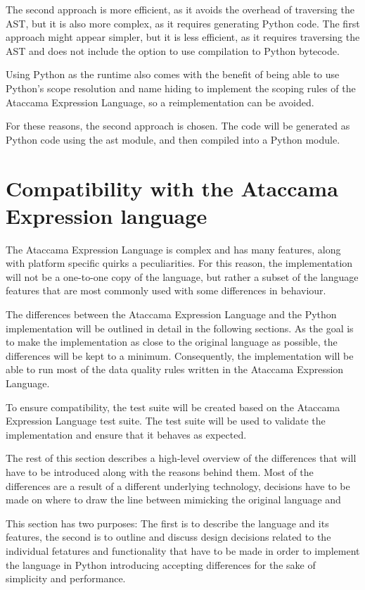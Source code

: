 The second approach is more efficient, as it avoids the overhead of traversing the AST, but it is also more complex, as it requires generating Python code. The first approach might appear simpler, but it is less efficient, as it requires traversing the AST and does not include the option to use compilation to Python bytecode.

Using Python as the runtime also comes with the benefit of being able to use Python's scope resolution and name hiding to implement the scoping rules of the Ataccama Expression Language, so a reimplementation can be avoided.

For these reasons, the second approach is chosen. The code will be generated as Python code using the ast module, and then compiled into a Python module.

\section{Compatibility with the Ataccama Expression language}

The Ataccama Expression Language is complex and has many features, along with
platform specific quirks a peculiarities. For this reason, the implementation will
not be a one-to-one copy of the language, but rather a subset of the language
features that are most commonly used with some differences in behaviour.

The differences between the Ataccama Expression Language and the Python
implementation will be outlined in detail in the following sections. As the goal
is to make the implementation as close to the original language as possible, the
differences will be kept to a minimum. Consequently, the implementation will be
able to run most of the data quality rules written in the Ataccama Expression
Language.

To ensure compatibility, the test suite will be created based on the Ataccama Expression Language test suite. The test suite will be used to validate the implementation and ensure that it behaves as expected.

The rest of this section describes a high-level overview of the differences that
will have to be introduced along with the reasons behind them. Most of the
differences are a result of a different underlying technology, decisions have to be
made on where to draw the line between mimicking the original language and

This section has two purposes: The first is to describe the language and its features, the second is to outline and discuss design decisions related to the individual fetatures and functionality that have to be made in order to implement the language in Python 
introducing accepting differences for the sake of simplicity and performance.

